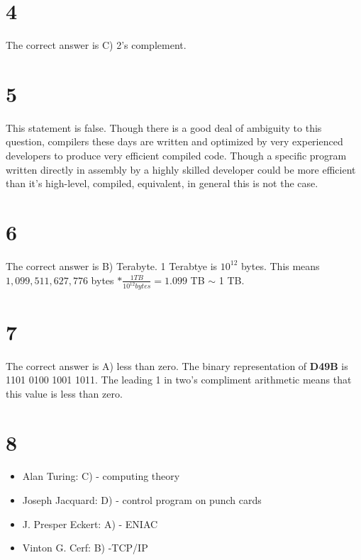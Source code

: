 \documentclass[a4paper,11pt]{article}
\begin{document}

\section*{4}
The correct answer is C) 2's complement.  


\section*{5}
This statement is false.  Though there is a good deal of ambiguity to this question, compilers these days are written and optimized by very experienced developers to produce very efficient compiled code.  Though a specific program written directly in assembly by a highly skilled developer could be more efficient than it's high-level, compiled, equivalent, in general this is not the case.


\section*{6}

The correct answer is B) Terabyte.  1 Terabtye is $10^{12}$ bytes.  This means $1,099,511,627,776$ bytes $* \frac{1 TB}{10^{12}  bytes} = 1.099$ TB $\sim$ 1 TB.


\section*{7}
The correct answer is A) less than zero.  The binary representation of {\bf D49B} is 1101 0100 1001 1011.  The leading 1 in two's compliment arithmetic means that this value is less than zero.



\section*{8}
\begin{itemize}
    \item Alan Turing: C) - computing theory
    \item Joseph Jacquard: D) - control program on punch cards
    \item J. Presper Eckert:  A) - ENIAC
    \item Vinton G. Cerf: B) -TCP/IP
\end{itemize}
\end{document}
